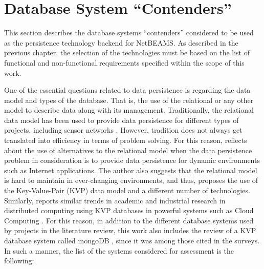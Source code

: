 \section{Database System ``Contenders''}

This section describes the database systems ``contenders'' considered to be used
as the persistence technology backend for NetBEAMS. As described in the
previous chapter, the selection of the technologies must be based on the list
of functional and non-functional requirements specified within the scope of
this work.

One of the essential questions related to data persistence is regarding the
data model and types of the database. That is, the use of the relational or
any other model to describe data along with its management. Traditionally, the
relational data model has been used to provide data persistence for different
types of projects, including sensor networks \cite{sn-dataware-house,
db-xml-enabled, sn-db-tinydb}. However, tradition does not always get
translated into efficiency in terms of problem solving. For this reason,
\cite{db-is-rdbs-dommed} reflects about the use of alternatives to the
relational model when the data persistence problem in consideration is to
provide data persistence for dynamic environments such as Internet applications.
The author also suggests that the relational model is hard to maintain in
ever-changing environments, and thus, proposes the use of the Key-Value-Pair
(KVP) data model and a different number of technologies. Similarly,
\cite{cloud-comp-survey} reports similar trends in academic and industrial
research in distributed computing using KVP databases in powerful systems
such as Cloud Computing \cite{cloud-comp-architectures}. For this reason, in
addition to the different database systems used by projects in the
literature review, this work also includes the review of a KVP database system
called mongoDB \cite{mongodb}, since it was among those cited in the surveys.
In such a manner, the list of the systems considered for assessment is the
following:

